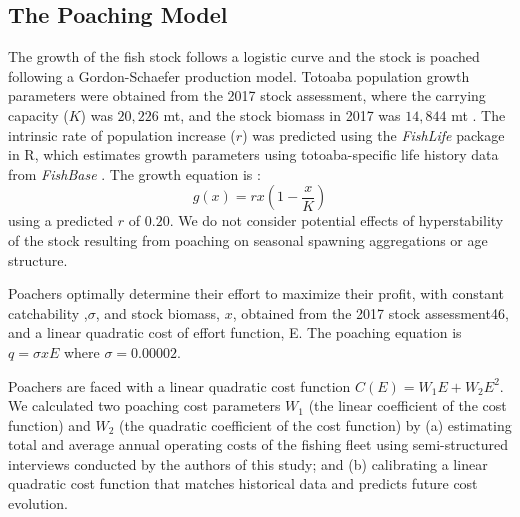 \subsection{The Poaching Model}

The growth of the fish stock follows a logistic curve and the stock is poached following a Gordon-Schaefer production model. Totoaba population growth parameters were obtained from the 2017 stock assessment, where the carrying capacity ($K$) was $20,226$ mt, and the stock biomass in 2017 was $14,844$ mt \citep{cisneros-mata_evaluacion_2020}. The intrinsic rate of population increase ($r$) was predicted using the \textit{FishLife} package in \textsf{R}, which estimates growth parameters using totoaba-specific life history data from \textit{FishBase} \citep{thorson_predicting_2017}. The growth equation is :
\begin{equation}
g(x) = rx\left(1-\frac{x}{K}\right)
\end{equation}
using a predicted $r$ of $0.20$. We do not consider potential effects of hyperstability of the stock resulting from poaching on seasonal spawning aggregations \citep{erisman_illusion_2011} or age structure.

Poachers optimally determine their effort to maximize their profit, with constant catchability ,$\sigma$, and stock biomass, $x$, obtained from the 2017 stock assessment46, and a linear quadratic cost of effort function, E. The poaching equation is $q =\sigma xE$ where $\sigma =  0.00002. $

Poachers are faced with a linear quadratic cost function $C(E) = W_1 E + W_2E^2$. We calculated two poaching cost parameters $W_1$ (the linear coefficient of the cost function) and $W_2$ (the quadratic coefficient of the cost function) by (a) estimating total and average annual operating costs of the fishing fleet using semi-structured interviews conducted by the authors of this study; and (b) calibrating a linear quadratic cost function that matches historical data and predicts future cost evolution. 

